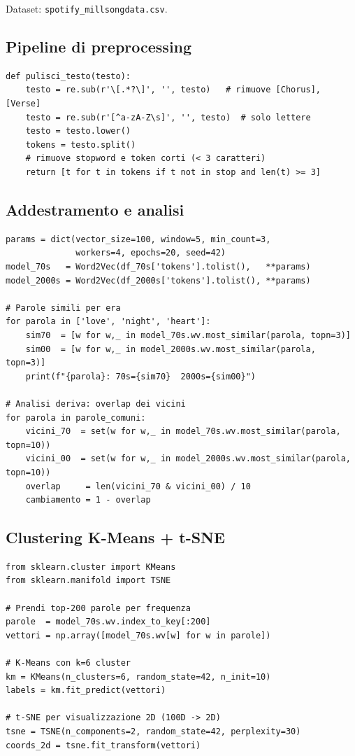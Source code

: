 \documentclass[12pt,a4paper]{article}
\begin{document}
Dataset: \texttt{spotify\_millsongdata.csv}.

\subsection{Pipeline di preprocessing}

\begin{lstlisting}
def pulisci_testo(testo):
    testo = re.sub(r'\[.*?\]', '', testo)   # rimuove [Chorus], [Verse]
    testo = re.sub(r'[^a-zA-Z\s]', '', testo)  # solo lettere
    testo = testo.lower()
    tokens = testo.split()
    # rimuove stopword e token corti (< 3 caratteri)
    return [t for t in tokens if t not in stop and len(t) >= 3]
\end{lstlisting}

\subsection{Addestramento e analisi}

\begin{lstlisting}
params = dict(vector_size=100, window=5, min_count=3,
              workers=4, epochs=20, seed=42)
model_70s   = Word2Vec(df_70s['tokens'].tolist(),   **params)
model_2000s = Word2Vec(df_2000s['tokens'].tolist(), **params)

# Parole simili per era
for parola in ['love', 'night', 'heart']:
    sim70  = [w for w,_ in model_70s.wv.most_similar(parola, topn=3)]
    sim00  = [w for w,_ in model_2000s.wv.most_similar(parola, topn=3)]
    print(f"{parola}: 70s={sim70}  2000s={sim00}")

# Analisi deriva: overlap dei vicini
for parola in parole_comuni:
    vicini_70  = set(w for w,_ in model_70s.wv.most_similar(parola, topn=10))
    vicini_00  = set(w for w,_ in model_2000s.wv.most_similar(parola, topn=10))
    overlap     = len(vicini_70 & vicini_00) / 10
    cambiamento = 1 - overlap
\end{lstlisting}

\subsection{Clustering K-Means + t-SNE}

\begin{lstlisting}
from sklearn.cluster import KMeans
from sklearn.manifold import TSNE

# Prendi top-200 parole per frequenza
parole  = model_70s.wv.index_to_key[:200]
vettori = np.array([model_70s.wv[w] for w in parole])

# K-Means con k=6 cluster
km = KMeans(n_clusters=6, random_state=42, n_init=10)
labels = km.fit_predict(vettori)

# t-SNE per visualizzazione 2D (100D -> 2D)
tsne = TSNE(n_components=2, random_state=42, perplexity=30)
coords_2d = tsne.fit_transform(vettori)
\end{lstlisting}
\end{document}
